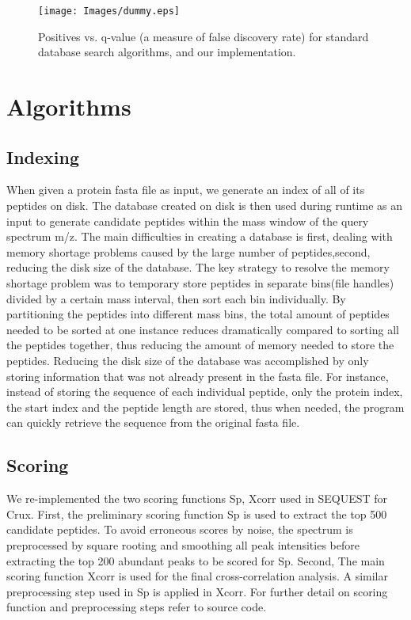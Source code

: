 \documentclass{bioinfo}
\begin{document}
\begin{figure}
  \centering
  \texttt{[image: Images/dummy.eps]}
  \caption{Positives vs. q-value (a measure of false discovery rate) for
  standard database search algorithms, and our implementation.}
  \label{figure:indexing}
\end{figure}



\section{Algorithms}

\subsection*{Indexing}
When given a protein fasta file as input, we generate an index of all of its peptides on disk. The database created on disk is then used during runtime as an input to generate candidate peptides within the mass window of the query spectrum m/z. The main difficulties in creating a database is first, dealing with memory shortage problems caused by the large number of peptides,second, reducing the disk size of the database. The key strategy to resolve the memory shortage problem was to temporary store peptides in separate bins(file handles) divided by a certain mass interval, then sort each bin individually. By partitioning the peptides into different mass bins, the total amount of peptides needed to be sorted at one instance reduces dramatically compared to sorting all the peptides together, thus reducing the amount of memory needed to store the peptides. Reducing the disk size of the database was accomplished by only storing information that was not already present in the fasta file. For instance, instead of storing the sequence of each individual peptide, only the protein index, the start index and the peptide length are stored, thus when needed, the program can quickly retrieve the sequence from the original fasta file.

\subsection*{Scoring}
We re-implemented the two scoring functions Sp, Xcorr  used in SEQUEST for Crux.  First, the preliminary scoring function Sp is used to extract the top 500 candidate peptides. To avoid erroneous scores by noise, the spectrum is preprocessed by square rooting and smoothing all peak intensities before extracting the top 200 abundant peaks to be scored for Sp. 
Second, The main scoring function Xcorr is used for the final cross-correlation analysis. A similar preprocessing step used in Sp is applied in Xcorr. For further detail on scoring function and preprocessing steps refer to source code.
\end{document}
